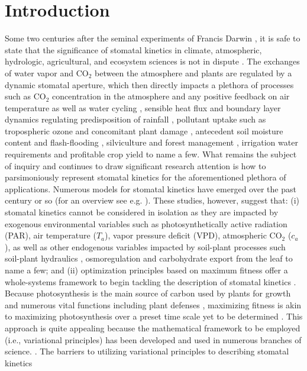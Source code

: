 \documentclass[utf8]{frontiersSCNS} %
\begin{document}
\section{Introduction}
Some two centuries after the seminal experiments of Francis Darwin \citep{darwin1898ix,scarth1927stomatal}, it is safe to state that the significance of stomatal kinetics in climate, atmospheric, hydrologic, agricultural, and ecosystem sciences is not in dispute \citep{hetherington2003role}.  The exchanges of water vapor and CO$_2$ between the atmosphere and plants are regulated by a dynamic stomatal aperture, which then directly impacts a plethora of processes such as CO$_2$ concentration in the atmosphere and any positive feedback on air temperature \citep{cox2000acceleration} as well as water cycling \citep{betts2007projected,katul2012evapotranspiration}, sensible heat flux and boundary layer dynamics regulating predisposition of rainfall \citep{siqueira2009soil, manoli2016soil}, pollutant uptake such as tropospheric ozone and concomitant plant damage \citep{rich1964ozone,musselman2006critical}, antecedent soil moisture content and flash-flooding \citep{javelle2010flash}, silviculture and forest management \citep{makela1986stand}, irrigation water requirements and profitable crop yield \citep{vico2015ecohydrology} to name a few.  What remains the subject of inquiry and continues to draw significant research attention is how to parsimoniously represent stomatal kinetics for the aforementioned plethora of applications. Numerous models for stomatal kinetics have emerged over the past century or so (for an overview see e.g. \citet{jarvis1976interpretation,interpretation_1976,collatz_physiological_1991,leuning_critical_1995,damour2010overview,way2011well} ). These studies, however, suggest that:  (i) stomatal kinetics cannot be considered in isolation as they are impacted by exogenous environmental variables \citep{jarvis1976interpretation,pearcy1990sunflecks,mott1991stomatal,medlyn_temperature_2002} such as photosynthetically active radiation (PAR), air temperature ($T_a$), vapor pressure deficit (VPD), atmospheric CO$_2$ ($c_a$), as well as other endogenous variables impacted by soil-plant processes such soil-plant hydraulics \citep{sperry_hydraulic_2000, brodribb_relations_2003}, osmoregulation and carbohydrate export from the leaf \citep{sevanto_how_2014,jensen2016sap,konrad2018xylem} to name a few; and  (ii) optimization principles based on maximum fitness offer a whole-systems framework to begin tackling the description of stomatal kinetics \citep{manzoni_optimizing_2011,manzoni_optimization_2013,huang2018transport}.  Because photosynthesis is the main source of carbon used by plants for growth and numerous vital functions  including plant defenses \citep{novick2012increased}, maximizing fitness is akin to maximizing photosynthesis over a preset time scale yet to be determined \citep{cowan1971relative,givnish1976sizes,cowan_stomatal_1977,dewar2010maximum}.  This approach is quite appealing because the mathematical framework to be employed (i.e., variational principles) has been developed and used in numerous branches of science.  \citep{witelski_variational_2015}.  The barriers to utilizing variational principles to describing stomatal kinetics 
\end{document}
